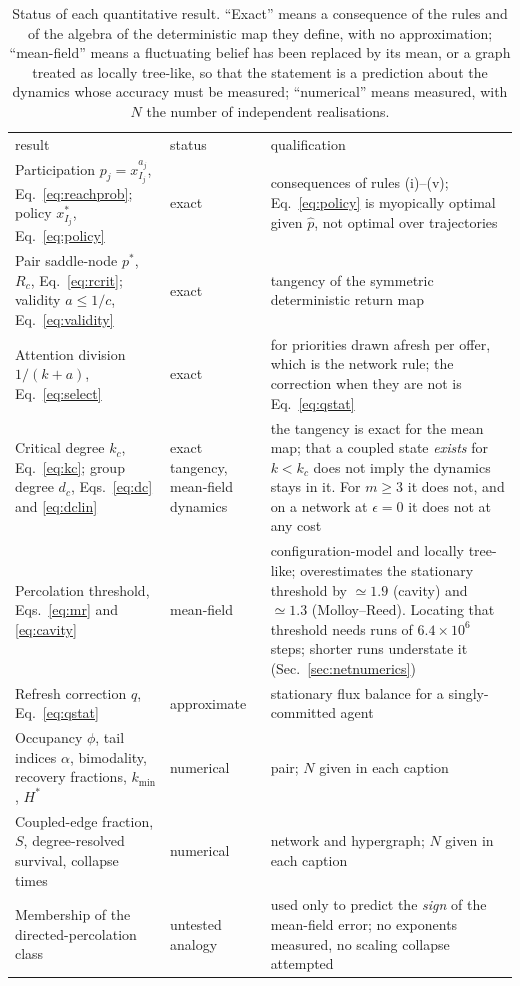 \documentclass[aps,pre,twocolumn,superscriptaddress,floatfix,longbibliography]{revtex4-2}
\begin{document}
\begin{table}[t]
\caption{Status of each quantitative result. ``Exact'' means a consequence
of the rules and of the algebra of the deterministic map they define, with no
approximation; ``mean-field'' means a fluctuating belief has been replaced by its
mean, or a graph treated as locally tree-like, so that the statement is a
prediction about the dynamics whose accuracy must be measured; ``numerical''
means measured, with $N$ the number of independent realisations.}
\label{tab:status}
\begin{ruledtabular}
\begin{tabular}{p{}lp{}}
result & status & qualification \\
\colrule
Participation $p_j=x_{I_j}^{a_j}$, Eq.~\eqref{eq:reachprob};
  policy $x^{*}_{I_j}$, Eq.~\eqref{eq:policy}
  & exact & consequences of rules (i)--(v); Eq.~\eqref{eq:policy} is myopically
    optimal given $\hat p$, not optimal over trajectories \\
Pair saddle-node $p^{*}$, $R_c$, Eq.~\eqref{eq:rcrit}; validity $a\le1/c$,
  Eq.~\eqref{eq:validity}
  & exact & tangency of the symmetric deterministic return map \\
Attention division $1/(k+a)$, Eq.~\eqref{eq:select}
  & exact & for priorities drawn afresh per offer, which is the network rule;
    the correction when they are not is Eq.~\eqref{eq:qstat} \\
Critical degree $k_c$, Eq.~\eqref{eq:kc}; group degree $d_c$,
  Eqs.~\eqref{eq:dc} and \eqref{eq:dclin}
  & exact tangency, mean-field dynamics & the tangency is exact for the mean map;
    that a coupled state \emph{exists} for $k<k_c$ does not imply the dynamics
    stays in it. For $m\ge3$ it does not, and on a network at $\epsilon=0$ it
    does not at any cost \\
Percolation threshold, Eqs.~\eqref{eq:mr} and \eqref{eq:cavity}
  & mean-field & configuration-model and locally tree-like; overestimates the
    stationary threshold by $\simeq1.9$ (cavity) and $\simeq1.3$
    (Molloy--Reed). Locating that threshold needs runs of $6.4\times10^{6}$
    steps; shorter runs understate it (Sec.~\ref{sec:netnumerics}) \\
Refresh correction $q$, Eq.~\eqref{eq:qstat}
  & approximate & stationary flux balance for a singly-committed agent \\
Occupancy $\phi$, tail indices $\alpha$, bimodality, recovery fractions,
  $k_{\min}$, $H^{*}$
  & numerical & pair; $N$ given in each caption \\
Coupled-edge fraction, $S$, degree-resolved survival, collapse times
  & numerical & network and hypergraph; $N$ given in each caption \\
Membership of the directed-percolation class
  & untested analogy & used only to predict the \emph{sign} of the mean-field
    error; no exponents measured, no scaling collapse attempted \\
\end{tabular}
\end{ruledtabular}
\end{table}
\end{document}
